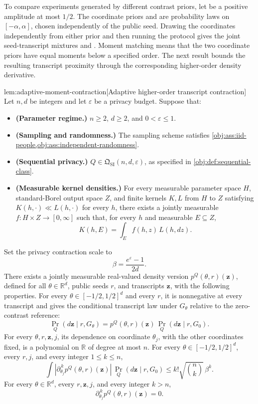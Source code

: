 \documentclass[11pt]{article}
\begin{document}
To compare experiments generated by different contrast priors, let  be a positive amplitude at most \(1/2\). The coordinate priors  and  are probability laws on \([-\alpha,\alpha]\), chosen independently of the public seed. Drawing the coordinates independently from either prior and then running the protocol gives the joint seed-transcript mixtures  and . Moment matching means that the two coordinate priors have equal moments below a specified order. The next result bounds the resulting transcript proximity through the corresponding higher-order density derivative.

\begin{lemmav}{lem:adaptive-moment-contraction}[Adaptive higher-order transcript contraction]
Let \(n,d\) be integers and let \(\varepsilon\) be a privacy budget. Suppose that:
\begin{itemize}
\item \textbf{(Parameter regime.)} \(n\ge2\), \(d\ge2\), and \(0<\varepsilon\le1\).
\item \textbf{(Sampling and randomness.)} The sampling scheme satisfies \cref{obj:ass:iid-people,obj:ass:independent-randomness}.
\item \textbf{(Sequential privacy.)} \(Q\in\mathfrak Q_{\mathrm{SI}}(n,d,\varepsilon)\), as specified in \cref{obj:def:sequential-class}.
\item \textbf{(Measurable kernel densities.)} For every measurable parameter space \(H\), standard-Borel output space \(Z\), and finite kernels \(K,L\) from \(H\) to \(Z\) satisfying \(K(h,\cdot)\ll L(h,\cdot)\) for every \(h\), there exists a jointly measurable \(f:H\times Z\to[0,\infty]\) such that, for every \(h\) and measurable \(E\subseteq Z\),
\[
K(h,E)=\int_E f(h,z)\,L(h,dz).
\]
\end{itemize}
Set the privacy contraction scale to
\[
\beta=\frac{e^\varepsilon-1}{2d}.
\]
There exists a jointly measurable real-valued density version \(p^Q(\theta,r)(\mathbf z)\), defined for all \(\theta\in\mathbb R^d\), public seeds \(r\), and transcripts \(\mathbf z\), with the following properties. For every \(\theta\in[-1/2,1/2]^d\) and every \(r\), it is nonnegative at every transcript and gives the conditional transcript law under \(G_\theta\) relative to the zero-contrast reference:
\[
\Pr_Q(d\mathbf z\mid r,G_\theta)
=
p^Q(\theta,r)(\mathbf z)\,
\Pr_Q(d\mathbf z\mid r,G_0).
\]
For every \(\theta,r,\mathbf z,j\), its dependence on coordinate \(\theta_j\), with the other coordinates fixed, is a polynomial on \(\mathbb R\) of degree at most \(n\). For every \(\theta\in[-1/2,1/2]^d\), every \(r,j\), and every integer \(1\le k\le n\),
\[
\int
\left|\partial_{\theta_j}^{\,k}p^Q(\theta,r)(\mathbf z)\right|
\,\Pr_Q(d\mathbf z\mid r,G_0)
\le
k!\sqrt{\binom nk}\,\beta^k.
\]
For every \(\theta\in\mathbb R^d\), every \(r,\mathbf z,j\), and every integer \(k>n\),
\[
\partial_{\theta_j}^{\,k}p^Q(\theta,r)(\mathbf z)=0.
\]


\end{lemmav}
\end{document}
